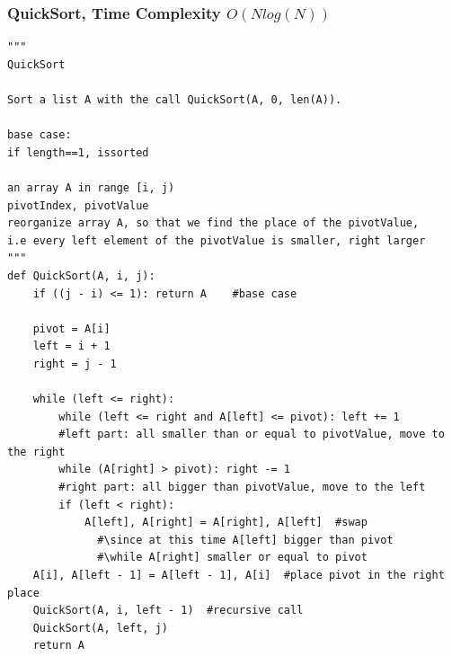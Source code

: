 \documentclass{article}
\begin{document}
\subsubsection*{QuickSort, Time Complexity $O(Nlog(N))$}
\begin{lstlisting}[style = py]
"""
QuickSort

Sort a list A with the call QuickSort(A, 0, len(A)).

base case: 
if length==1, issorted

an array A in range [i, j)
pivotIndex, pivotValue
reorganize array A, so that we find the place of the pivotValue, 
i.e every left element of the pivotValue is smaller, right larger
"""
def QuickSort(A, i, j):
    if ((j - i) <= 1): return A    #base case

    pivot = A[i]   
    left = i + 1
    right = j - 1

    while (left <= right):
        while (left <= right and A[left] <= pivot): left += 1 
        #left part: all smaller than or equal to pivotValue, move to the right
        while (A[right] > pivot): right -= 1
        #right part: all bigger than pivotValue, move to the left
        if (left < right):    
            A[left], A[right] = A[right], A[left]  #swap 
              #\since at this time A[left] bigger than pivot 
              #\while A[right] smaller or equal to pivot
    A[i], A[left - 1] = A[left - 1], A[i]  #place pivot in the right place
    QuickSort(A, i, left - 1)  #recursive call
    QuickSort(A, left, j)
    return A
\end{lstlisting}
\end{document}
